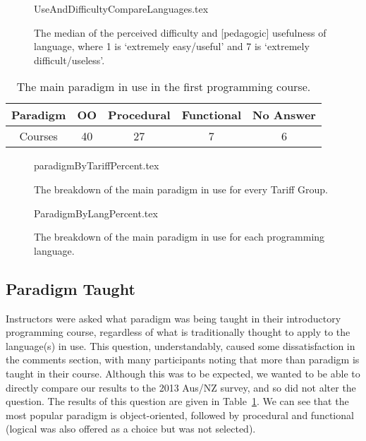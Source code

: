 \documentclass{sig-alternate}
\begin{document}
\begin{figure}
\begin{center}
{UseAndDifficultyCompareLanguages.tex}
\end{center}\vskip-18pt
\caption{The median of the perceived difficulty and [pedagogic] usefulness of language, where 1 is `extremely easy/useful' and 7 is `extremely difficult/useless'.%
\label{fig:utility}}
\end{figure}
\begin{table}[ht]
\centering
\caption{The main paradigm in use in the first programming course.}
\label{tab:paradigm}
\begin{tabular}{ccccc}
\hline
Paradigm & OO & Procedural & Functional & No Answer \\ \hline
Courses  & 40              & 27         & 7    & 6      \\ \hline
\end{tabular}
\end{table}

\begin{figure}[ht]\vskip-12pt
\begin{center}
{paradigmByTariffPercent.tex}
\end{center}\vskip-18pt
\caption{The breakdown of the main paradigm in use for every Tariff Group.\label{fig:paradigmTariff}}
\end{figure}

\begin{figure}
\begin{center}
{ParadigmByLangPercent.tex}
\end{center}\vskip-18pt
\caption{The breakdown of the main paradigm in use for each programming language.\label{fig:paradigmLang}}
\end{figure}
\subsection{Paradigm Taught}

Instructors were asked what paradigm was being taught in their
introductory programming course, regardless of what is traditionally
thought to apply to the language(s) in use. This question,
understandably, caused some dissatisfaction in the comments section,
with many participants noting that more than paradigm is taught in
their course. Although this was to be expected, we wanted to be able
to directly compare our results to the 2013 Aus/NZ survey, and so did
not alter the question. The results of this question are given in
Table~\ref{tab:paradigm}. We can see that the most popular paradigm is
object-oriented, followed by procedural and functional (logical was
also offered as a choice but was not selected).
\end{document}

